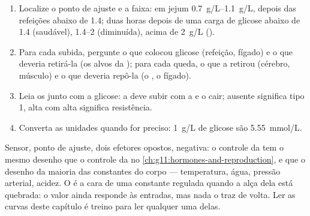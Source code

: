 \begin{method}\label{met:g12:glucose-and-diabetes:read}
\begin{enumerate}
  \item Localize o ponto de ajuste e a faixa: em jejum
        \qtyrange{0.7}{1.1}{g/L}, depois das refeições abaixo de
        \num{1.4}; duas horas depois de uma carga de glicose abaixo de
        \num{1.4} (saudável), \qtyrange{1.4}{2}{} (diminuída), acima de
        \qty{2}{g/L} ().
  \item Para cada subida, pergunte o que colocou glicose (refeição,
        fígado) e o que deveria retirá-la (os alvos da ); para
        cada queda, o que a retirou (cérebro, músculo) e o que deveria
        repô-la (o , o fígado).
  \item Leia os  junto com a glicose: a  deve subir
        com a  e o  cair;  ausente significa
        tipo 1,  alta com  alta significa resistência.
  \item Converta as unidades quando for preciso: \qty{1}{g/L} de
        glicose são \qty{5.55}{mmol/L}.
\end{enumerate}
\end{method}

\begin{remark}\label{rem:g12:glucose-and-diabetes:model}
Sensor, ponto de ajuste, dois efetores opostos, 
negativa: o controle da  tem o mesmo desenho que o controle da
 no \cref{ch:g11:hormones-and-reproduction}, e que o
desenho da maioria das constantes do corpo --- temperatura, água,
pressão arterial, acidez. O  é a cara de uma constante regulada
quando a alça dela está quebrada: o valor ainda responde às entradas,
mas nada o traz de volta. Ler as curvas deste capítulo é treino para
ler qualquer uma delas.
\end{remark}

